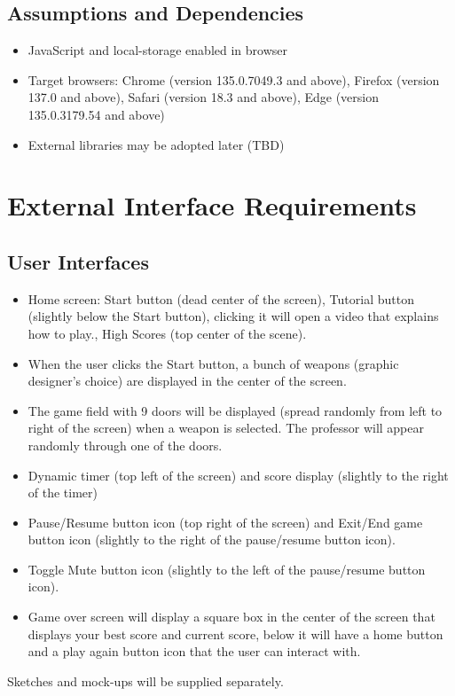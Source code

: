 \documentclass[11pt]{scrreprt}
\begin{document}
\section{Assumptions and Dependencies}
\begin{itemize}
  \item JavaScript and local-storage enabled in browser
  \item Target browsers: Chrome (version 135.0.7049.3 and above), Firefox (version 137.0 and above), Safari (version 18.3 and above), Edge (version 135.0.3179.54 and above)
  \item External libraries may be adopted later (TBD)
\end{itemize}

\chapter{External Interface Requirements}

\section{User Interfaces}
\begin{itemize}
  \item Home screen: {Start{ button (dead center of the screen)}, Tutorial button (slightly below the Start button), clicking it will open a video that explains how to play.}, {High Scores (top center of the scene). }
  \item When the user clicks the Start button, a bunch of weapons (graphic designer's choice) are displayed in the center of the screen. 
  \item The game field with 9 doors will be displayed (spread randomly from left to right of the screen) when a weapon is selected. The professor will appear randomly through one of the doors.
  \item Dynamic timer (top left of the screen) and score display (slightly to the right of the timer)
  \item Pause/Resume button icon (top right of the screen) and Exit/End game button icon (slightly to the right of the pause/resume button icon).
  \item Toggle Mute button icon (slightly to the left of the pause/resume button icon).
  \item Game over screen will display a square box in the center of the screen that displays your best score and current score, below it will have a home button and a play again button icon that the user can interact with.
\end{itemize}
Sketches and mock-ups will be supplied separately.
\end{document}
